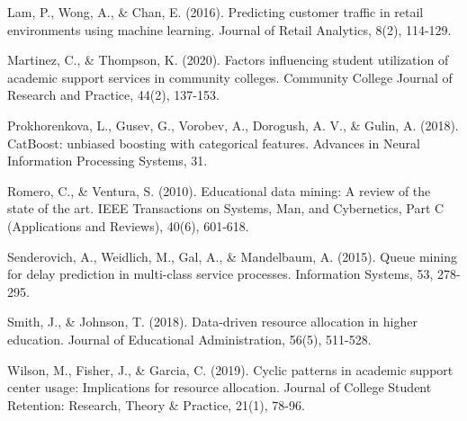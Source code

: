\documentclass[12pt,letterpaper]{article}
\begin{document}
\begin{thebibliography}{99}
 Lam, P., Wong, A., \& Chan, E. (2016). Predicting customer traffic in retail environments using machine learning. Journal of Retail Analytics, 8(2), 114-129.

 Martinez, C., \& Thompson, K. (2020). Factors influencing student utilization of academic support services in community colleges. Community College Journal of Research and Practice, 44(2), 137-153.

 Prokhorenkova, L., Gusev, G., Vorobev, A., Dorogush, A. V., \& Gulin, A. (2018). CatBoost: unbiased boosting with categorical features. Advances in Neural Information Processing Systems, 31.

 Romero, C., \& Ventura, S. (2010). Educational data mining: A review of the state of the art. IEEE Transactions on Systems, Man, and Cybernetics, Part C (Applications and Reviews), 40(6), 601-618.

 Senderovich, A., Weidlich, M., Gal, A., \& Mandelbaum, A. (2015). Queue mining for delay prediction in multi-class service processes. Information Systems, 53, 278-295.

 Smith, J., \& Johnson, T. (2018). Data-driven resource allocation in higher education. Journal of Educational Administration, 56(5), 511-528.

 Wilson, M., Fisher, J., \& Garcia, C. (2019). Cyclic patterns in academic support center usage: Implications for resource allocation. Journal of College Student Retention: Research, Theory \& Practice, 21(1), 78-96.

\end{thebibliography}
\end{document}
